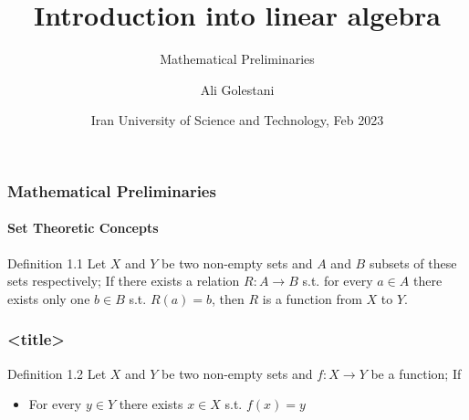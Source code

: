 \documentclass{beamer}
\title[Linear Algebra 101] %
{Introduction into linear algebra}
\subtitle{Mathematical Preliminaries}
\author[Golestani, Ali]{Ali Golestani}
\institute[IUST] %
{
  \inst{}%
  Department of Mathematics\\
  Iran University of Science and Technology
}
\date[IUST 2023] %
{Iran University of Science and Technology, Feb 2023}
\begin{document}
\frame{\titlepage}

\begin{frame}
    \frametitle{Mathematical Preliminaries}
    \framesubtitle{Set Theoretic Concepts}
    
\begin{block}{Definition 1.1}
    Let $X$ and $Y$ be two non-empty sets and $A$ and $B$ subsets of these sets respectively; If there exists a relation  $R: A \rightarrow B$ s.t.
    for every $a \in A$ there exists only one $b \in B$ s.t. $R(a) = b$, then $R$ is a function from $X$ to $Y$.
\end{block}

\end{frame}

\begin{frame}
    \frametitle{<title>}

    \begin{block}{Definition 1.2}
        Let $X$ and $Y$ be two non-empty sets and $f: X \rightarrow Y$ be a function; If 
        \begin{itemize}
            \item For every $y \in Y$ there exists $x \in X$ s.t. $f(x) = y$
        \end{itemize}
    \end{block}

\end{frame}
\end{document}
